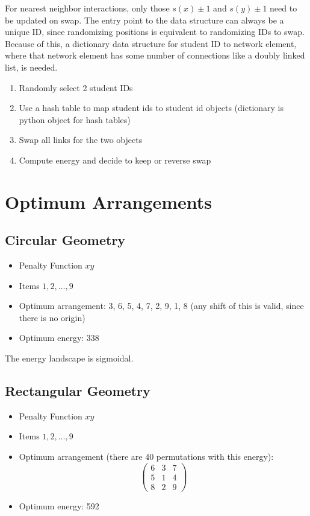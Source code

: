 \documentclass{article}
\begin{document}
For nearest neighbor interactions, only those $s(x) \pm 1$ and $s(y) \pm 1$ need to be updated on swap. The entry point to the data structure can always be a unique ID, since randomizing positions is equivalent to randomizing IDs to swap. Because of this, a dictionary data structure for student ID to network element, where that network element has some number of connections like a doubly linked list, is needed.

\begin{enumerate}
    \item Randomly select 2 student IDs
    \item Use a hash table to map student ids to student id objects (dictionary is python object for hash tables) 
    \item Swap all links for the two objects
    \item Compute energy and decide to keep or reverse swap
\end{enumerate}

\appendix

\section{Optimum Arrangements}
\subsection{Circular Geometry}
\begin{itemize}
    \item Penalty Function $xy$
    \item Items $1, 2, \ldots, 9$
    \item Optimum arrangement: 3, 6, 5, 4, 7, 2, 9, 1, 8 (any shift of this is valid, since there is no origin)
    \item Optimum energy: 338
\end{itemize}

The energy landscape is sigmoidal.

\subsection{Rectangular Geometry}

\begin{itemize}
    \item Penalty Function $xy$
    \item Items $1, 2, \ldots, 9$
    \item Optimum arrangement (there are 40 permutations with this energy): 
        \begin{equation}
        \begin{pmatrix}
            6 & 3 & 7 \\
            5 & 1 & 4 \\
            8 & 2 & 9
        \end{pmatrix}
        \end{equation}
    \item Optimum energy: 592
\end{itemize}
\end{document}
